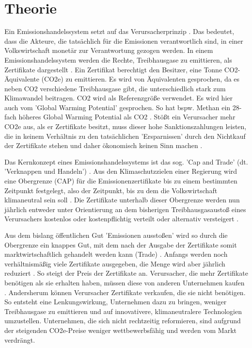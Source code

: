 \chapter{Theorie}

Ein Emissionshandelssystem setzt auf das Verursacherprinzip \cite[S. 161]{hubert.2020}.
Das bedeutet, dass die Akteure, die tatsächlich für die Emissionen verantwortlich sind, in einer Volkswirtschaft monetär zur Verantwortung gezogen werden.
In einem Emissionshandelssystem werden die Rechte, Treibhausgase zu emittieren, als Zertifikate dargestellt \cite[S. 27]{rabe.2018}.
Ein Zertifikat berechtigt den Besitzer, eine Tonne CO2-Äquivalente (CO2e) zu emittieren.
Es wird von Äquivalenten gesprochen, da es neben CO2 verschiedene Treibhausgase gibt, die unterschiedlich stark zum Klimawandel beitragen. CO2 wird als Referenzgröße verwendet.
Es wird hier auch vom 'Global Warming Potential' gesprochen. So hat bspw. Methan ein 28-fach höheres Global Warming Potential als CO2 \cite{ub.2023}.
Stößt ein Verursacher mehr CO2e aus, als er Zertifikate besitzt, muss dieser hohe Sanktionszahlungen leisten, die in keinem Verhältnis zu den tatsächlichen 'Ersparnissen' durch den Nichtkauf der Zertifikate stehen und daher ökonomisch keinen Sinn machen \cite[S. 181]{hubert.2020}.

Das Kernkonzept eines Emissionshandelssystems ist das sog. 'Cap and Trade' (dt. 'Verknappen und Handeln') \cite[S. 134]{rabe.2018}.
Aus den Klimaschutzzielen einer Regierung wird eine Obergrenze (CAP) für die Emissionenzertifikate bis zu einem bestimmten Zeitpunkt festgelegt, also der Zeitpunkt, bis zu dem die Volkswirtschaft klimaneutral sein soll \cite[S. 181]{hubert.2020}.
Die Zertifikate unterhalb dieser Obergrenze werden nun jährlich entweder unter Orientierung an dem bisherigen Treibhausgasaustoß eines Verursachers kostenlos oder kostenpflichtig verteilt oder alternativ versteigert \cite[S. 181]{hubert.2020}.

Aus dem bislang öffentlichen Gut 'Emissionen ausstoßen' wird so durch die Obergrenze ein knappes Gut, mit dem nach der Ausgabe der Zertifikate somit marktwirtschaftlich gehandelt werden kann (Trade) \cite[S. 17]{hubert.2020}.
Anfangs werden noch verhältnismäßig viele Zertifikate ausgegeben, die Menge wird aber jährlich reduziert \cite[S. 182]{hubert.2020}. So steigt der Preis der Zertifikate an.
Verursacher, die mehr Zertifikate benötigen als sie erhalten haben, müssen diese von anderen Unternehmen kaufen \cite[S. 182]{hubert.2020}.
Andersherum können Verursacher Zertifikate verkaufen, die sie nicht benötigen.
So entsteht eine Lenkungswirkung, Unternehmen dazu zu bringen, weniger Treibhausgase zu emittieren und auf innovativere, klimaneutralere Technologien umzustellen.
Unternehmen, die sich nicht rechtzeitig reformieren, sind aufgrund der steigenden CO2e-Preise weniger wettbewerbsfähig und werden vom Markt verdrängt.